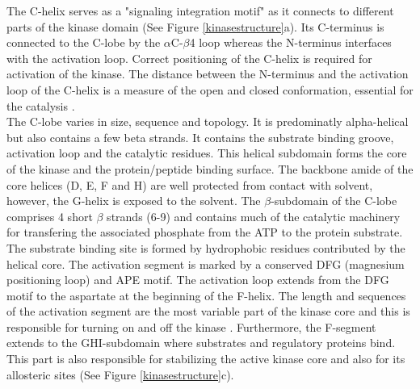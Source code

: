 \documentclass[a4paper, 11pt]{report}
\begin{document}
The C-helix serves as a "signaling integration motif" as it connects to different parts of the kinase domain (See Figure \ref{kinasestructure}a). Its C-terminus is connected to the C-lobe by the $\alpha$C-$\beta$4 loop whereas the N-terminus interfaces with the activation loop. Correct positioning of the C-helix is required for activation of the kinase. The distance between the N-terminus and the activation loop of the C-helix is a measure of the open and closed conformation, essential for the catalysis \cite{taylor2011protein}.\\

The C-lobe varies in size, sequence and topology. It is predominatly alpha-helical but also contains a few beta strands. It contains the substrate binding groove, activation loop and the catalytic residues. This helical subdomain forms the core of the kinase and the protein/peptide binding surface. The backbone amide of the core helices (D, E, F and H) are well protected from contact with solvent, however, the G-helix is exposed to the solvent. The $\beta$-subdomain of the C-lobe comprises 4 short $\beta$ strands (6-9) and contains much of the catalytic machinery for transfering the associated phosphate from the ATP to the protein substrate. The substrate binding site is formed by hydrophobic residues contributed by the helical core. The activation segment is marked by a conserved DFG (magnesium positioning loop) and APE motif. The activation loop extends from the DFG motif to the aspartate at the beginning of the F-helix. The length and sequences of the activation segment are the most variable part of the kinase core and this is responsible for turning on and off the kinase \cite{taylor2011protein}. Furthermore, the F-segment extends to the GHI-subdomain where substrates and regulatory proteins bind. This part is also responsible for stabilizing the active kinase core and also for its allosteric sites (See Figure \ref{kinasestructure}c).\par
\end{document}
